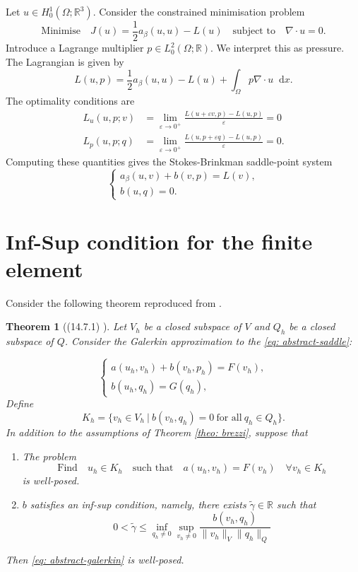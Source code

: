 \documentclass[12pt]{article}
\newcommand{\dd}{\mathop{}\!\mathrm{d}}
\theoremstyle{theorem}
\newtheorem{theorem}{Theorem}[section]
\begin{document}
Let $u \in H^1_0(\Omega ; \mathbb{R}^3)$. Consider the constrained minimisation problem
$$
    \text{Minimise} \quad J(u) = \frac{1}{2}a_\beta(u, u) - L(u) \quad \text{subject to} \quad \nabla \cdot u = 0.
$$
Introduce a Lagrange multiplier $p \in L^2_0(\Omega ; \mathbb{R})$. We interpret this as pressure. The Lagrangian is given by
$$
L(u, p) = \frac{1}{2}a_\beta(u, u) - L(u) + \int_\Omega p \nabla \cdot u \dd x.
$$
The optimality conditions are
\begin{align*}
    L_u(u, p; v) &= \lim_{\varepsilon \rightarrow 0^+} \frac{L(u+\varepsilon v, p) - L(u, p)}{\varepsilon} = 0\\
    L_p(u, p; q) &= \lim_{\varepsilon \rightarrow 0^+} \frac{L(u, p+\varepsilon q) - L(u, p)}{\varepsilon} = 0.
\end{align*}
Computing these quantities gives the Stokes-Brinkman saddle-point system
$$
\begin{cases}
    a_\beta(u, v)+b(v,p) = L(v), \\
    b(u, q) = 0.
\end{cases}
$$

\section{Inf-Sup condition for the finite element}\label{app: inf-sup}

Consider the following theorem reproduced from \cite{farrell-fem}.

\begin{theorem}[(14.7.1) \cite{farrell-fem}]
    Let $V_h$ be a closed subspace of $V$ and $Q_h$ be a closed subspace of $Q$. Consider the Galerkin approximation to the \eqref{eq: abstract-saddle}:
    
    \begin{equation}\label{eq: abstract-galerkin}
        \begin{cases}
            a(u_h, v_h)+b(v_h,p_h) = F(v_h), \\
            b(u_h, q_h) = G(q_h),
        \end{cases}
    \end{equation}
    Define
    \begin{equation}
        K_h = \{v_h \in V_h\ | \ b(v_h, q_h) = 0\ \text{for all}\ q_h \in Q_h\}.
    \end{equation}
    In addition to the assumptions of Theorem \ref{theo: brezzi}, suppose that
    \begin{enumerate}
        \item The problem
        $$
        \text{Find} \quad u_h \in K_h \quad \text{such that} \quad a(u_h, v_h) = F(v_h) \quad \forall v_h \in K_h
        $$
        is well-posed.
        \item $b$ satisfies an inf-sup condition, namely, there exists $\tilde \gamma \in \mathbb{R}$ such that
        $$
            0<\tilde \gamma \leq \inf_{q_h \neq 0} \sup_{v_h \neq 0} \frac{b(v_h, q_h)}{\lVert v_h\rVert_V \lVert q_h\rVert_Q}
        $$
    \end{enumerate}
    Then \eqref{eq: abstract-galerkin} is well-posed.
    
\end{theorem}
\end{document}
